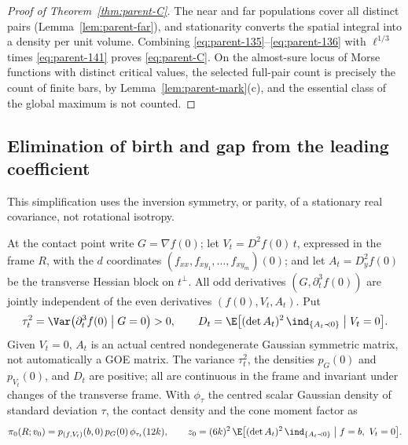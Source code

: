 \begin{proof}[Proof of Theorem~\ref{thm:parent-C}]
The near and far populations cover all distinct pairs (Lemma~\ref{lem:parent-far}), and stationarity converts the spatial integral into a density per unit volume. Combining \eqref{eq:parent-135}--\eqref{eq:parent-136} with $\ell^{1/3}$ times \eqref{eq:parent-141} proves \eqref{eq:parent-C}. On the almost-sure locus of Morse functions with distinct critical values, the selected full-pair count is precisely the count of finite bars, by Lemma~\ref{lem:parent-mark}(c), and the essential class of the global maximum is not counted.
\end{proof}

\subsection{Elimination of birth and gap from the leading coefficient}\label{ssec:parent-coef}

This simplification uses the inversion symmetry, or parity, of a stationary real covariance, not rotational isotropy.

\begin{lemma}\label{lem:parent-parity}
At the contact point write $G=\nabla f(0)$; let $V_t=D^2f(0)\,t$, expressed in the frame $R$, with the $d$ coordinates $(f_{xx},f_{xy_1},\dots,f_{xy_m})(0)$; and let $A_t=D_y^2f(0)$ be the transverse Hessian block on $t^\perp$. All odd derivatives $(G,\partial_t^3f(0))$ are jointly independent of the even derivatives $(f(0),V_t,A_t)$. Put
\begin{equation}\label{eq:parent-151}
\tau_t^2=\Var\bigl(\partial_t^3f(0)\bigm|G=0\bigr)>0,\qquad D_t=\E\bigl[(\det A_t)^2\,\ind_{\{A_t\prec0\}}\bigm|V_t=0\bigr].
\end{equation}
Given $V_t=0$, $A_t$ is an actual centred nondegenerate Gaussian symmetric matrix, not automatically a GOE matrix. The variance $\tau_t^2$, the densities $p_G(0)$ and $p_{V_t}(0)$, and $D_t$ are positive; all are continuous in the frame and invariant under changes of the transverse frame. With $\phi_\tau$ the centred scalar Gaussian density of standard deviation $\tau$, the contact density and the cone moment factor as
\begin{equation}\label{eq:parent-factor}
\pi_0(R;v_0)=p_{(f,V_t)}(b,0)\,p_G(0)\,\phi_{\tau_t}(12k),\qquad z_0=(6k)^2\,\E\bigl[(\det A_t)^2\,\ind_{\{A_t\prec0\}}\bigm|f=b,\ V_t=0\bigr].
\end{equation}
\end{lemma}

